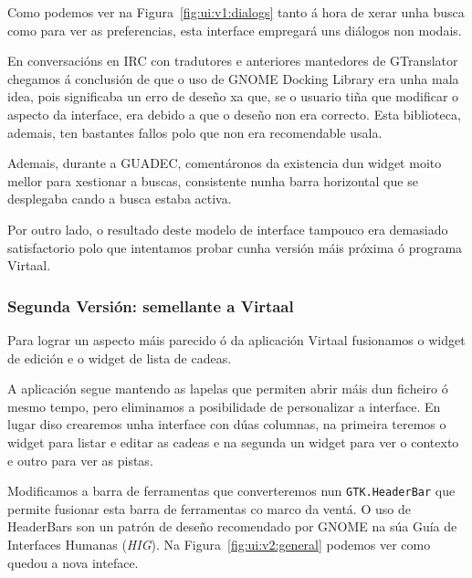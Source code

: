 Como podemos ver na Figura~\ref{fig:ui:v1:dialogs} tanto á hora de xerar unha busca como para ver as preferencias, esta interface empregará uns diálogos non modais.

En conversacións en IRC con tradutores e anteriores mantedores de GTranslator chegamos á conclusión de que o uso de GNOME Docking Library era unha mala idea, pois significaba un erro de deseño xa que, se o usuario tiña que modificar o aspecto da interface, era debido a que o deseño non era correcto. Esta biblioteca, ademais, ten bastantes fallos polo que non era recomendable usala.

Ademais, durante a GUADEC, comentáronos da existencia dun widget moito mellor para xestionar a buscas, consistente nunha barra horizontal que se desplegaba cando a busca estaba activa.

Por outro lado, o resultado deste modelo de interface tampouco era demasiado satisfactorio polo que intentamos probar cunha versión máis próxima ó programa Virtaal.

\subsubsection{Segunda Versión: semellante a Virtaal}

Para lograr un aspecto máis parecido ó da aplicación Virtaal fusionamos o widget de edición e o widget de lista de cadeas.

A aplicación segue mantendo as lapelas que permiten abrir máis dun ficheiro ó mesmo tempo, pero eliminamos a posibilidade de personalizar a interface. En lugar diso crearemos unha interface con dúas columnas, na primeira teremos o widget para listar e editar as cadeas e na segunda un widget para ver o contexto e outro para ver as pistas.

Modificamos a barra de ferramentas que converteremos nun \lstinline{GTK.HeaderBar} que permite fusionar esta barra de ferramentas co marco da ventá. O uso de HeaderBars son un patrón de deseño recomendado por GNOME na súa Guía de Interfaces Humanas (\emph{HIG})\cite{website:gnomehig}. Na Figura~\ref{fig:ui:v2:general} podemos ver como quedou a nova inteface.

